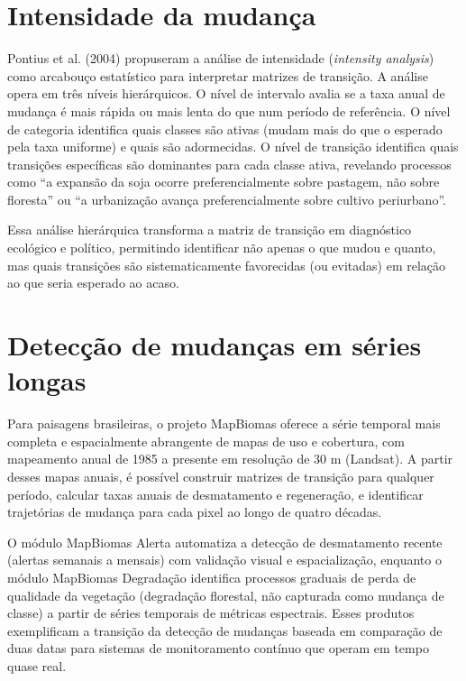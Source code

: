 \documentclass[
  portuguese,
  11pt,
  a4paper,
  open=any]{scrbook}
\begin{document}
\section{Intensidade da mudança}\label{intensidade-da-mudanuxe7a}

Pontius et al. (2004) propuseram a análise de intensidade
(\emph{intensity analysis}) como arcabouço estatístico para interpretar
matrizes de transição. A análise opera em três níveis hierárquicos. O
nível de intervalo avalia se a taxa anual de mudança é mais rápida ou
mais lenta do que num período de referência. O nível de categoria
identifica quais classes são ativas (mudam mais do que o esperado pela
taxa uniforme) e quais são adormecidas. O nível de transição identifica
quais transições específicas são dominantes para cada classe ativa,
revelando processos como ``a expansão da soja ocorre preferencialmente
sobre pastagem, não sobre floresta'' ou ``a urbanização avança
preferencialmente sobre cultivo periurbano''.

Essa análise hierárquica transforma a matriz de transição em diagnóstico
ecológico e político, permitindo identificar não apenas o que mudou e
quanto, mas quais transições são sistematicamente favorecidas (ou
evitadas) em relação ao que seria esperado ao acaso.

\section{Detecção de mudanças em séries
longas}\label{detecuxe7uxe3o-de-mudanuxe7as-em-suxe9ries-longas}

Para paisagens brasileiras, o projeto MapBiomas oferece a série temporal
mais completa e espacialmente abrangente de mapas de uso e cobertura,
com mapeamento anual de 1985 a presente em resolução de 30 m (Landsat).
A partir desses mapas anuais, é possível construir matrizes de transição
para qualquer período, calcular taxas anuais de desmatamento e
regeneração, e identificar trajetórias de mudança para cada pixel ao
longo de quatro décadas.

O módulo MapBiomas Alerta automatiza a detecção de desmatamento recente
(alertas semanais a mensais) com validação visual e espacialização,
enquanto o módulo MapBiomas Degradação identifica processos graduais de
perda de qualidade da vegetação (degradação florestal, não capturada
como mudança de classe) a partir de séries temporais de métricas
espectrais. Esses produtos exemplificam a transição da detecção de
mudanças baseada em comparação de duas datas para sistemas de
monitoramento contínuo que operam em tempo quase real.
\end{document}
